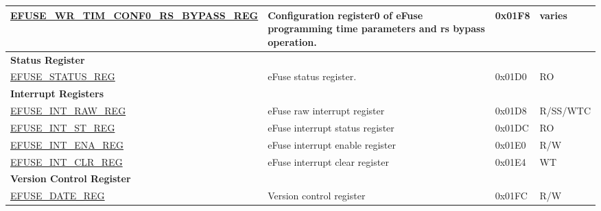 \begin{longtable}{ | p{5.8cm} | p{7cm} | p{1.3cm} | p{1.2cm} | }
\hyperref[regdesc:EFUSEWRTIMCONF0RSBYPASSREG]{EFUSE\_\-WR\_\-TIM\_\-CONF0\_\-RS\_\-BYPASS\_\-REG} & Configuration register0 of eFuse programming time parameters and rs bypass operation. & 0x01F8 & varies \\ \hline
\multicolumn{4}{|l|}{\textbf{Status Register}} \\ \hline
\hyperref[regdesc:EFUSESTATUSREG]{EFUSE\_STATUS\_REG} & eFuse status register. & 0x01D0 & RO \\ \hline
\multicolumn{4}{|l|}{\textbf{Interrupt Registers}} \\ \hline
\hyperref[regdesc:EFUSEINTRAWREG]{EFUSE\_INT\_RAW\_REG} & eFuse raw interrupt register & 0x01D8 & R/SS/WTC \\ \hline
\hyperref[regdesc:EFUSEINTSTREG]{EFUSE\_INT\_ST\_REG} & eFuse interrupt status register & 0x01DC & RO \\ \hline
\hyperref[regdesc:EFUSEINTENAREG]{EFUSE\_INT\_ENA\_REG} & eFuse interrupt enable register & 0x01E0 & R/W \\ \hline
\hyperref[regdesc:EFUSEINTCLRREG]{EFUSE\_INT\_CLR\_REG} & eFuse interrupt clear register & 0x01E4 & WT \\ \hline
\multicolumn{4}{|l|}{\textbf{Version Control Register}} \\ \hline
\hyperref[regdesc:EFUSEDATEREG]{EFUSE\_DATE\_REG} & Version control register & 0x01FC & R/W \\ \hline
\end{longtable}
